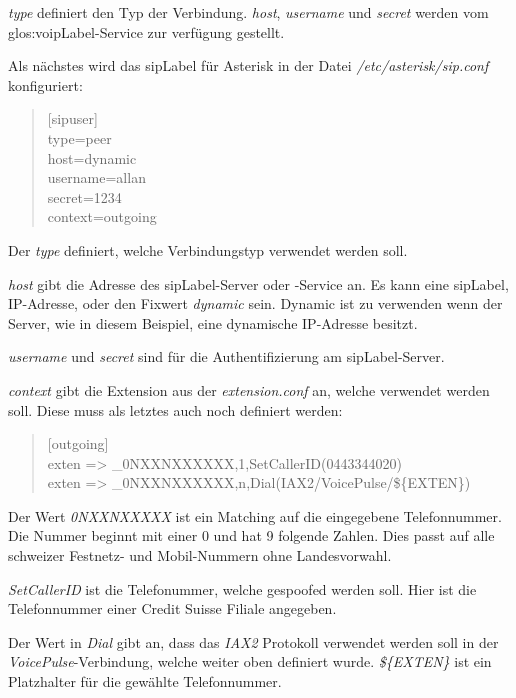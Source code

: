 \textit{type} definiert den Typ der Verbindung. \textit{host}, \textit{username} und \textit{secret} werden vom \gls{glos:voipLabel}-Service zur verfügung gestellt.

Als nächstes wird das \Gls{sipLabel} für Asterisk in der Datei \textit{/etc/asterisk/sip.conf} konfiguriert:
\begin{quote}
[sipuser]\\
type=peer\\
host=dynamic\\
username=allan\\
secret=1234\\
context=outgoing\\
\end{quote}

Der \textit{type} definiert, welche Verbindungstyp verwendet werden soll.

\textit{host} gibt die Adresse des \Gls{sipLabel}-Server oder -Service an. Es kann eine \Gls{sipLabel}, IP-Adresse, oder den Fixwert \textit{dynamic} sein. Dynamic ist zu verwenden wenn der Server, wie in diesem Beispiel, eine dynamische IP-Adresse besitzt.

\textit{username} und \textit{secret} sind für die Authentifizierung am \Gls{sipLabel}-Server.

\textit{context} gibt die Extension aus der \textit{extension.conf} an, welche verwendet werden soll. Diese muss als letztes auch noch definiert werden:

\begin{quote}
[outgoing]\\
exten => \_0NXXNXXXXXX,1,SetCallerID(0443344020)\\
exten => \_0NXXNXXXXXX,n,Dial(IAX2/VoicePulse/\$\{EXTEN\})\\
\end{quote}

Der Wert \textit{0NXXNXXXXX} ist ein Matching auf die eingegebene Telefonnummer. Die Nummer beginnt mit einer 0 und hat 9 folgende Zahlen. Dies passt auf alle schweizer Festnetz- und Mobil-Nummern ohne Landesvorwahl. 

\textit{SetCallerID} ist die Telefonummer, welche gespoofed werden soll. Hier ist die Telefonnummer einer Credit Suisse Filiale angegeben.

Der Wert in \textit{Dial} gibt an, dass das \textit{IAX2} Protokoll verwendet werden soll in der \textit{VoicePulse}-Verbindung, welche weiter oben definiert wurde. \textit{\$\{EXTEN\}} ist ein Platzhalter für die gewählte Telefonnummer.

